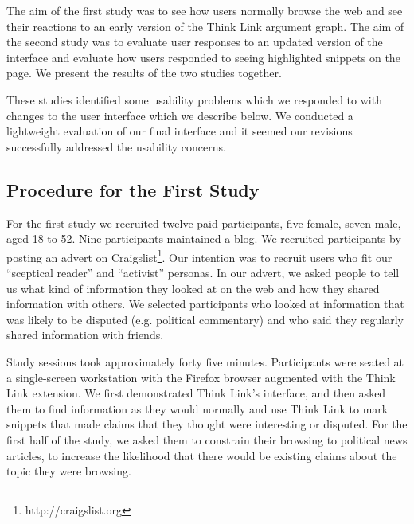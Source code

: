 \documentclass{chi2009}
\newcommand{\todo}[1]{}
\begin{document}
The aim of the first study was to see how users normally browse the web and see their reactions to an early version of the Think Link argument graph. The aim of the second study was to evaluate user responses to an updated version of the interface and evaluate how users responded to seeing highlighted snippets on the page. We present the results of the two studies together.

These studies identified some usability problems which we responded to with changes to the user interface which we describe below. We conducted a lightweight evaluation of our final interface and it seemed our revisions successfully addressed the usability concerns.

\todo{Test with at least 4 people}
\todo{Say something about final informal evaluation}


\subsection{Procedure for the First Study}

For the first study we recruited twelve paid participants, five female, seven male, aged 18 to 52. Nine participants maintained a blog. We recruited participants by posting an advert on Craigslist\footnote{http://craigslist.org}.
Our intention was to recruit users who fit our ``sceptical reader'' and ``activist'' personas. In our advert, we asked people to tell us what kind of information they looked at on the web and how they shared information with others. We selected participants who looked at information that was likely to be disputed (e.g. political commentary) and who said they regularly shared information with friends. 

\todo{This was a bad recruiting strategy. We should have recruited people that fitted one of our two personas and then set them tasks that fitted our vision for that persona.}

Study sessions took approximately forty five minutes. Participants were seated at a single-screen workstation with the Firefox browser augmented with the Think Link extension. We first demonstrated Think Link's interface, and then asked them to find information as they would normally and use Think Link to mark snippets that made claims that they thought were interesting or disputed. For the first half of the study, we asked them to constrain their browsing to political news articles, to increase the likelihood that there would be existing claims about the topic they were browsing.
\end{document}
